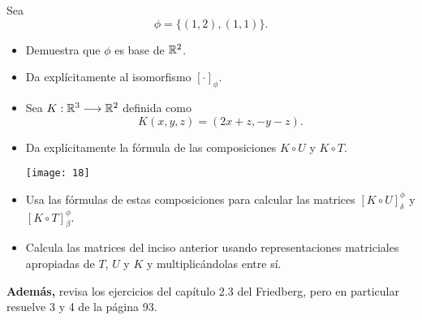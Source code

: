 Sea 
\begin{equation}
	\label{eq: ejercicio 4 phi}
	\phi = \{ (1, 2), (1, 1) \}.
\end{equation}
\begin{itemize}
	\item Demuestra que $\phi$ es base de $\mathbb{R}^{2}$.
	\item Da explícitamente al isomorfismo 
	$[\cdot]_{\phi}$.
	\item Sea $K : \mathbb{R}^{3} \longrightarrow \mathbb{R}^{2}$
	definida como
	\[
	K(x, y, z) = (2x+z, -y - z).
	\]
	\item Da explícitamente la fórmula de las composiciones
	$K\circ U$ y $K \circ T$.
	\begin{marginfigure}
	\texttt{[image: 18]} 
	\end{marginfigure}
	\item Usa las fórmulas de estas composiciones para calcular
	las matrices $[K \circ U]_{\delta}^{\phi}$ y 
	$[K \circ T]_{\beta}^{\phi}$.
	\item Calcula las matrices del inciso anterior usando
	representaciones matriciales apropiadas de $T$, $U$ y $K$
	y multiplicándolas entre sí.
\end{itemize}

\textbf{Además,} revisa los ejercicios del capítulo 2.3 del Friedberg,
pero en particular resuelve
3 y 4 de la página 93.
